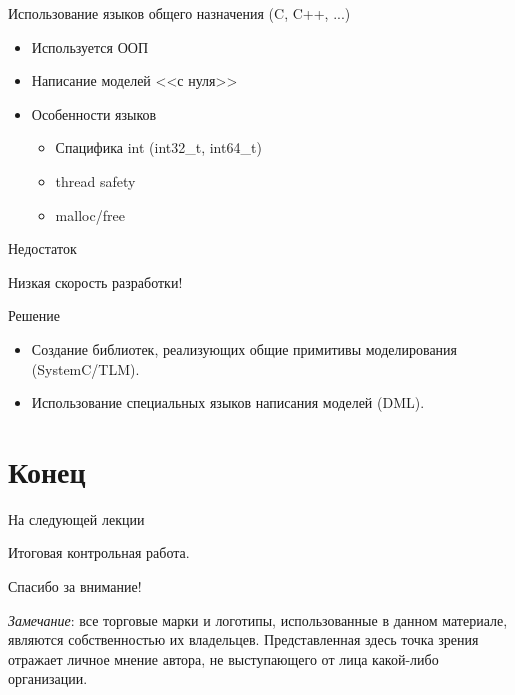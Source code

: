 \begin{frame}{Использование языков общего назначения (C, C++, ...)}

\begin{itemize}
  \item Используется ООП
  \item Написание моделей <<с нуля>>
  \item Особенности языков
  \begin{itemize}
    \item Спацифика int (int32\_t, int64\_t)
    \item thread safety
    \item malloc/free
  \end{itemize}
\end{itemize}

\end{frame}

\begin{frame}{Недостаток}

Низкая скорость разработки!

\end{frame}

\begin{frame}{Решение}

\begin{itemize}
  \item Создание библиотек, реализующих общие примитивы моделирования (SystemC/TLM).
  \item Использование специальных языков написания моделей (DML).
\end{itemize}

\end{frame}


\section{Конец}

\begin{frame}{На следующей лекции}

Итоговая контрольная работа.

\end{frame}

\begin{frame}

{\huge{Спасибо за внимание!}\par}

\vfill

\tiny{\textit{Замечание}: все торговые марки и логотипы, использованные в данном материале, являются собственностью их владельцев. Представленная здесь точка зрения отражает личное мнение автора, не выступающего от лица какой-либо организации.}

\end{frame}


